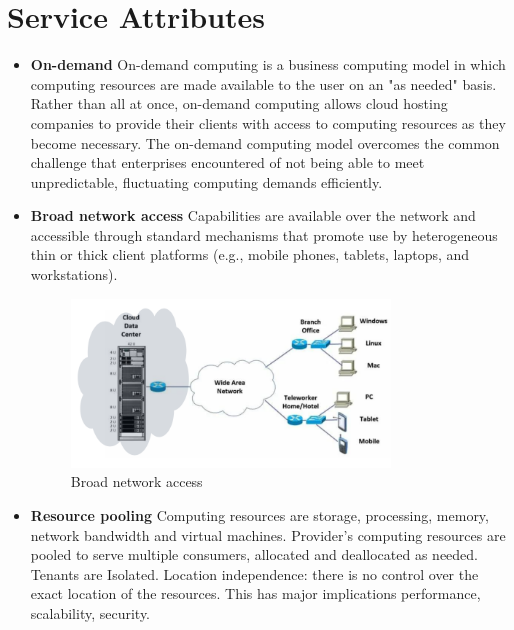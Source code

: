\section{Service Attributes}

\begin{itemize}
    \item \textbf{On-demand}
    On-demand computing is a business computing
    model in which computing resources are made
    available to the user
    on an "as needed" basis.
    Rather than all at once, on-demand computing
    allows cloud hosting companies to provide their
    clients with access to computing resources as they
    become necessary.
    The on-demand computing model overcomes the
    common challenge that enterprises encountered of
    not being able to meet unpredictable, fluctuating
    computing demands efficiently.
    \item \textbf{Broad network access}
    Capabilities are available
    over the network and
    accessible through
    standard mechanisms that
    promote use by
    heterogeneous thin or
    thick client platforms
    (e.g., mobile phones,
    tablets, laptops, and
    workstations).
    \begin{figure}[H]
        \centering
        \includegraphics[width=0.8\textwidth]{assets/fig11.png}
        \caption{Broad network access}
        \label{fig:broad-network-access}
    \end{figure}
    \item \textbf{Resource pooling}
    Computing resources are storage,
    processing, memory, network
    bandwidth and virtual machines. 
    Provider’s computing resources are
    pooled to serve multiple consumers,
    allocated and deallocated as needed.
    Tenants are Isolated. Location independence: there is no
    control over the exact location of the
    resources. This has major implications
    performance, scalability, security.
    \begin{figure}[H]
        \centering

\end{figure}
\end{itemize}
